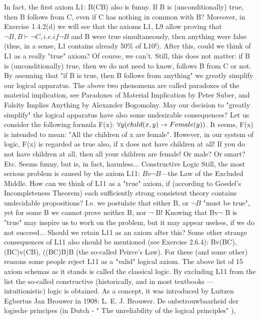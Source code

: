 In fact, the first axiom L1: B\IMPLIES (C\IMPLIES B) also is funny. If B is (unconditionally) true, then B follows from C,
even if C has nothing in common with B? Moreover, in Exercise 1.4.2(d) we will see that the axioms L1,
L9 allow proving that \(\neg B, B \vdash \neg C, i.e. if \neg B\) and B were true simultaneously, then anything were false
(thus, in a sense, L1 contains already 50\% of L10!). After this, could we think of L1 as a really "true"
axiom? Of course, we can't. Still, this does not matter: if B is (unconditionally) true, then we do not need
to know, follows B from C or not. By assuming that "if B is true, then B follows from anything" we
greatly simplify our logical apparatus.
The above two phenomena are called paradoxes of the material implication, see Paradoxes of Material
Implication by Peter Suber, and Falsity Implies Anything by Alexander Bogomolny.
May our decision to "greatly simplify" the logical apparatus have also some undesirable consequences?
Let us consider the following formula F(x): \(\forall y(child(x, y)\rightarrow Female(y))\).
It seems, F(x) is intended to mean: "All the children of x are female". However, in our system of logic, F(x) is regarded as true also, if
x does not have children at all! If you do not have children at all, then all your children are female! Or
male? Or smart? Etc. Seems funny, but is, in fact, harmless...
Constructive Logic
Still, the most serious problem is caused by the axiom L11: \(Bv\neg B\)---the Law of the Excluded Middle.
How can we think of L11 as a "true" axiom, if (according to Goedel's Incompleteness Theorem) each sufficiently strong consistent theory contains undecidable propositions? I.e. we postulate that either B, or
\(\neg B\) "must be true", yet for some B we cannot prove neither B, nor \(\neg\) B! Knowing that Bv\(\neg\) B is "true" may
inspire us to work on the problem, but it may appear useless, if we do not succeed... Should we retain L11
as an axiom after this?
Some other strange consequences of L11 also should be mentioned (see Exercise 2.6.4):
Bv(B\IMPLIES C),
(B\IMPLIES C)v(C\IMPLIES B),
((B\IMPLIES C)\IMPLIES B)\IMPLIES B (the so-called Peirce's Law).
For these (and some other) reasons some people reject L11 as a "valid" logical axiom.
The above list of 15 axiom schemas as it stands is called the classical logic.
By excluding L11 from the list the so-called constructive (historically, and in most textbooks ---
intuitionistic) logic is obtained. As a concept, it was introduced by Luitzen Egbertus Jan Brouwer in
1908:
L. E. J. Brouwer. De onbetrouwbaarheid der logische principes (in Dutch - " The unreliability of the logical principles" ),
